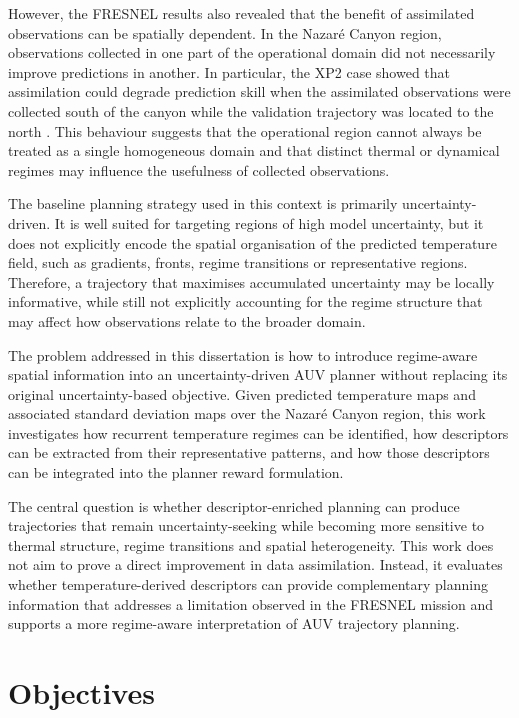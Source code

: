 However, the FRESNEL results also revealed that the benefit of assimilated observations can be spatially dependent. In the Nazaré Canyon region, observations collected in one part of the operational domain did not necessarily improve predictions in another. In particular, the XP2 case showed that assimilation could degrade prediction skill when the assimilated observations were collected south of the canyon while the validation trajectory was located to the north \cite{mendes2025oceanmodeldriven}. This behaviour suggests that the operational region cannot always be treated as a single homogeneous domain and that distinct thermal or dynamical regimes may influence the usefulness of collected observations.

The baseline planning strategy used in this context is primarily uncertainty-driven. It is well suited for targeting regions of high model uncertainty, but it does not explicitly encode the spatial organisation of the predicted temperature field, such as gradients, fronts, regime transitions or representative regions. Therefore, a trajectory that maximises accumulated uncertainty may be locally informative, while still not explicitly accounting for the regime structure that may affect how observations relate to the broader domain.

The problem addressed in this dissertation is how to introduce regime-aware spatial information into an uncertainty-driven AUV planner without replacing its original uncertainty-based objective. Given predicted temperature maps and associated standard deviation maps over the Nazaré Canyon region, this work investigates how recurrent temperature regimes can be identified, how descriptors can be extracted from their representative patterns, and how those descriptors can be integrated into the planner reward formulation.

The central question is whether descriptor-enriched planning can produce trajectories that remain uncertainty-seeking while becoming more sensitive to thermal structure, regime transitions and spatial heterogeneity. This work does not aim to prove a direct improvement in data assimilation. Instead, it evaluates whether temperature-derived descriptors can provide complementary planning information that addresses a limitation observed in the FRESNEL mission and supports a more regime-aware interpretation of AUV trajectory planning.


\section{Objectives} \label{sec:objectives}

